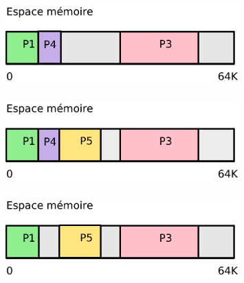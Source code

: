 \begin{frame}
\frametitle{\insertsubsection}
\begin{figure}[h]
  \includegraphics[width=0.8\textwidth]{fig2/frag-3}
\end{figure}
\end{frame}

\begin{frame}
\frametitle{\insertsubsection}
\begin{figure}[h]
  \includegraphics[width=0.8\textwidth]{fig2/frag-4}
\end{figure}
\end{frame}

\begin{frame}
\frametitle{\insertsubsection}
\begin{figure}[h]
  \includegraphics[width=0.8\textwidth]{fig2/frag-5}
\end{figure}
\end{frame}


